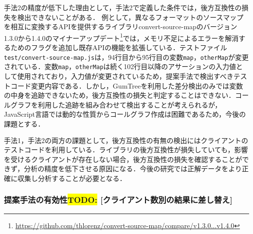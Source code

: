 \documentclass[submit]{ipsj}
\newcommand{\todo}[1]{\colorbox{yellow}{{\bf TODO}:}{\color{red} {\textbf{[#1]}}}}
\begin{document}
手法2の精度が低下した理由として，手法2で定義した条件では，後方互換性の損失を検出できないことがある．
例として，異なるフォーマットのソースマップを相互に変換するAPIを提供するライブラリconvert-source-mapのバージョン1.3.0から1.4.0のマイナーアップデート\footnote{\url{https://github.com/thlorenz/convert-source-map/compare/v1.3.0...v1.4.0}}では，メモリ不足によるエラーを解消するためのフラグを追加し既存APIの機能を拡張している．テストファイル\verb|test/convert-source-map.js|は，94行目から95行目の変数{\verb|map|}，{\verb|otherMap|}が変更されている．変数{\verb|map|}，{\verb|otherMap|}は続く102行目以降のアサーションの入力値として使用されており，入力値が変更されているため，提案手法で検出すべきテストコード変更内容である．しかし，GumTreeを利用した差分検出のみでは変数の中身を追跡できないため，後方互換性の損失と判定することはできない．コールグラフを利用した追跡を組み合わせて検出することが考えられるが，JavaScript言語では動的な性質からコールグラフ作成は困難であるため\cite{js-call-graph}，今後の課題とする．



手法1，手法2の両方の課題として，後方互換性の有無の検出にはクライアントのテストコードを利用している．ライブラリの後方互換性が損失していても，影響を受けるクライアントが存在しない場合，後方互換性の損失を確認することができず，分析の精度を低下させる原因になる．今後の研究では正解データをより正確に収集し分析することが必要となる．

\subsubsection{提案手法の有効性\todo{クライアント数別の結果に差し替え}}
\end{document}
